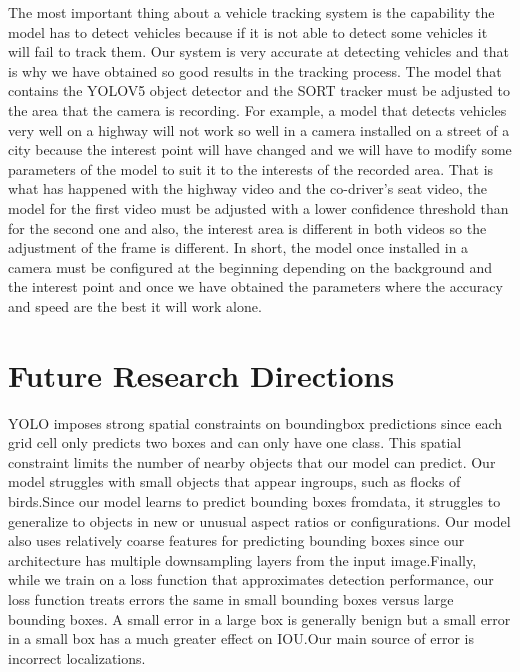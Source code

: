 The  most  important  thing  about  a  vehicle  tracking  system  is  the  capability  the  model  has  to 
detect  vehicles  because  if  it  is  not  able  to  detect  some  vehicles  it  will  fail  to  track  them.  Our 
system is very accurate at detecting vehicles and that is why we have obtained so good results 
in  the  tracking  process.  The  model  that  contains  the  YOLOV5  object  detector  and  the  SORT 
tracker must be adjusted to the area that the camera is recording. For example, a model that 
detects vehicles very well on a highway will not work so well in a camera installed on a street of 
a city because the interest point will have changed and we will have to modify some parameters 
of the model to suit it to the interests of the recorded area. That is what has happened with the 
highway video and the co-driver’s seat video, the model for the first video must be adjusted with 
a lower confidence threshold than for the second one and also, the interest area is different in 
both videos so the adjustment of the frame is different. In short, the model once installed in a 
camera  must  be  configured  at  the  beginning  depending  on  the  background  and  the  interest 
point and once we have obtained the parameters where the accuracy and speed are the best it 
will work alone. 


\section{Future Research Directions}
YOLO imposes strong spatial constraints on boundingbox predictions since each grid cell only predicts two boxes and can only have one class. This spatial constraint limits the number of nearby objects that our model can predict. Our model struggles with small objects that appear ingroups, such as flocks of birds.Since our model learns to predict bounding boxes fromdata, it struggles to generalize to objects in new or unusual aspect ratios or configurations. Our model also uses relatively coarse features for predicting bounding boxes since our architecture has multiple downsampling layers from the input image.Finally, while we train on a loss function that approximates detection performance, our loss function treats errors the same in small bounding boxes versus large bounding boxes. A small error in a large box is generally benign but a small error in a small box has a much greater effect on IOU.Our main source of error is incorrect localizations.
